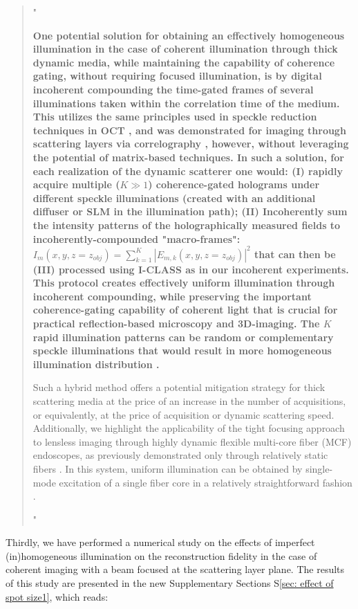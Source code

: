 \documentclass[12pt]{article}
\newenvironment{finished_ourresponse}
    {\begin{tcolorbox}[width=\linewidth,breakable,enhanced,colback=gray!5,colframe=finished_responsecolor!50,title=Response,left=5pt,right=5pt]}
    {\end{tcolorbox}}
\begin{document}
\begin{finished_ourresponse}
\begin{quote}
     "{\bfseries
     One potential solution for obtaining an effectively homogeneous illumination in the case of coherent illumination through thick dynamic media, while maintaining the capability of coherence gating, without requiring focused illumination, is by digital incoherent compounding the time-gated frames of several illuminations taken within the correlation time of the medium. This utilizes the same principles used in speckle reduction techniques in OCT \cite{liba2017speckle}, and was demonstrated for imaging through scattering layers via correlography \cite{idell1987image, salhov2018depth, metzler2020deepinverse}, however, without leveraging the potential of matrix-based techniques.
     In such a solution, for each realization of the dynamic scatterer one would: (I) rapidly acquire multiple ($K \gg 1$) coherence-gated holograms under different speckle illuminations (created with an additional diffuser or SLM in the illumination path); (II) Incoherently sum the intensity patterns of the holographically measured fields to incoherently-compounded "macro-frames": $I_m(x,y,z=z_{obj}) = \sum_{k=1}^{K}|E_{m,k}(x,y,z=z_{obj})|^2$  that can then be (III) processed using I-CLASS as in our incoherent experiments.
     This protocol creates effectively uniform illumination through incoherent compounding, while preserving the important coherence-gating capability of coherent light that is crucial for practical reflection-based microscopy and 3D-imaging. The $K$ rapid illumination patterns can be random or complementary speckle illuminations that would result in more homogeneous illumination distribution \cite{gateau2017complementary}.

     Such a hybrid method offers a potential mitigation strategy for thick scattering media at the price of an increase in the number of acquisitions, or equivalently, at the price of acquisition or dynamic scattering speed.
     Additionally, we highlight the applicability of the tight focusing approach to lensless imaging through highly dynamic flexible multi-core fiber (MCF) endoscopes, as previously demonstrated only through relatively static fibers \cite{choi2022flexible, haim2025image}. In this system, uniform illumination can be obtained by single-mode excitation of a single fiber core in a relatively straightforward fashion \cite{choi2022flexible, weinberg2024ptychographic}.}"
     \end{quote}


Thirdly, we have performed a numerical study on the effects of imperfect (in)homogeneous illumination on the reconstruction fidelity in the case of coherent imaging with a beam focused at the scattering layer plane.
The results of this study are presented in the new Supplementary Sections  S\ref{sec: effect of spot size1}, which reads:


\end{finished_ourresponse}
\end{document}
